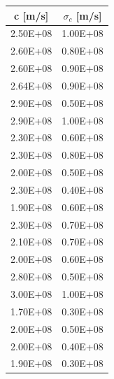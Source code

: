 \documentclass{article}
\begin{document}
            \begin{minipage}{\textwidth}

                \begin{minipage}[b]{0.35\textwidth}

                    \centering
                    \begin{tabular}{c c} 
                        
                        \toprule
                        c [m/s] &  $\sigma_c$ [m/s] \\ 
                        \midrule
                        2.50E+08	&    1.00E+08 \\
                        2.60E+08	&    0.80E+08 \\
                        2.60E+08	&    0.90E+08 \\
                        2.64E+08	&    0.90E+08 \\
                        2.90E+08	&    0.50E+08 \\
                        2.90E+08	&    1.00E+08 \\
                        2.30E+08	&    0.60E+08 \\
                        2.30E+08	&    0.80E+08 \\
                        2.00E+08	&    0.50E+08 \\
                        2.30E+08	&    0.40E+08 \\
                        1.90E+08	&    0.60E+08 \\
                        2.30E+08	&    0.70E+08 \\
                        2.10E+08	&    0.70E+08 \\
                        2.00E+08	&    0.60E+08 \\
                        2.80E+08	&    0.50E+08 \\
                        3.00E+08	&    1.00E+08 \\
                        1.70E+08	&    0.30E+08 \\
                        2.00E+08	&    0.50E+08 \\
                        2.00E+08	&    0.40E+08 \\
                        1.90E+08	&    0.30E+08 \\
                        \bottomrule

                    \end{tabular}
                    

\end{minipage}
\end{minipage}
\end{document}
